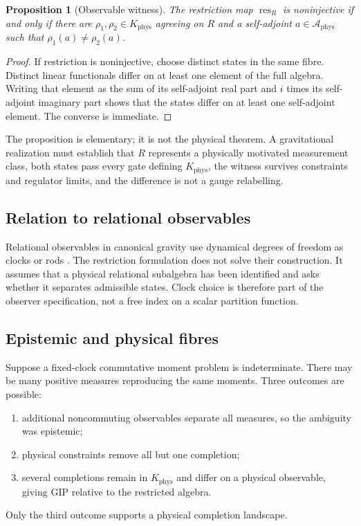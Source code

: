 \documentclass[11pt,a4paper]{article}
\newtheorem{proposition}[theorem]{Proposition}
\theoremstyle{definition}
\theoremstyle{remark}
\newcommand{\A}{\mathcal A}
\newcommand{\Kphys}{K_{\mathrm{phys}}}
\newcommand{\res}{\operatorname{res}}
\begin{document}
\begin{proposition}[Observable witness]
The restriction map $\res_R$ is noninjective if and only if there are
$\rho_1,\rho_2\in\Kphys$ agreeing on $R$ and a
self-adjoint $a\in\A_{\mathrm{phys}}$ such that
$\rho_1(a)\ne\rho_2(a)$.
\end{proposition}

\begin{proof}
If restriction is noninjective, choose distinct states in the same fibre.
Distinct linear functionals differ on at least one element of the full algebra.
Writing that element as the sum of its self-adjoint real part and $i$ times
its self-adjoint imaginary part shows that the states differ on at least one
self-adjoint element.  The converse is immediate.
\end{proof}

The proposition is elementary; it is not the physical theorem.  A gravitational
realization must establish that $R$ represents a physically motivated
measurement class, both states pass every gate defining $\Kphys$, the witness
survives constraints and regulator limits, and the difference is not a gauge
relabelling.

\subsection{Relation to relational observables}

Relational observables in canonical gravity use dynamical degrees of freedom as
clocks or rods \cite{Rovelli1991,Dittrich2006}.  The restriction formulation
does not solve their construction.  It assumes that a physical relational
subalgebra has been identified and asks whether it separates admissible states.
Clock choice is therefore part of the observer specification, not a free index
on a scalar partition function.

\subsection{Epistemic and physical fibres}

Suppose a fixed-clock commutative moment problem is indeterminate.  There may
be many positive measures reproducing the same moments.  Three outcomes are
possible:
\begin{enumerate}[label=(\roman*)]
 \item additional noncommuting observables separate all measures, so the
 ambiguity was epistemic;
 \item physical constraints remove all but one completion;
 \item several completions remain in $\Kphys$ and differ on a physical
 observable, giving GIP relative to the restricted algebra.
\end{enumerate}
Only the third outcome supports a physical completion landscape.
\end{document}

